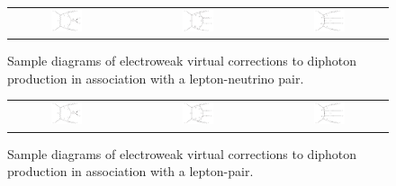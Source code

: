 \begin{figure}[t!]
  \begin{tabular}{ccccc}
    \includegraphics[width=0.288\textwidth]{diagrams/aaW_V_2} & &
    \includegraphics[width=0.288\textwidth]{diagrams/aaW_V_1} & &
    \includegraphics[width=0.288\textwidth]{diagrams/aaW_V_3} \\
  \end{tabular}
  \caption{
    Sample diagrams of electroweak virtual corrections to diphoton 
    production in association with a lepton-neutrino pair.
  }
\end{figure}

\begin{figure}[t!]
  \begin{tabular}{ccccc}
    \includegraphics[width=0.288\textwidth]{diagrams/aaZ_V_2} & &
    \includegraphics[width=0.288\textwidth]{diagrams/aaZ_V_1} & &
    \includegraphics[width=0.288\textwidth]{diagrams/aaZ_V_3} \\
  \end{tabular}
  \caption{
    Sample diagrams of electroweak virtual corrections to diphoton 
    production in association with a lepton-pair.
  }
\end{figure}
